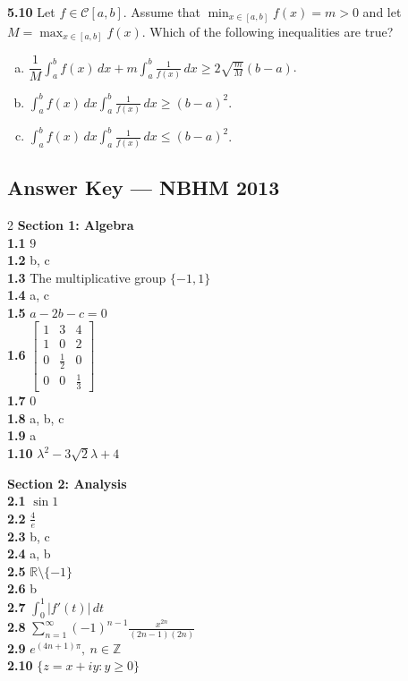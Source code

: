 \documentclass[11pt,a4paper]{article}
\newcommand{\Z}{\mathbb{Z}}
\newcommand{\R}{\mathbb{R}}
\newcommand{\examsec}[1]{%
  \subsection*{#1}
  \vspace{-2pt}
}
\newcommand{\qitem}[1]{\par\medskip\noindent\textbf{#1}\hspace{0.5em}}
\begin{document}
\qitem{5.10} Let $f \in \mathcal{C}[a, b]$. Assume that $\min_{x \in [a, b]} f(x) = m > 0$ and let $M = \max_{x \in [a, b]} f(x)$. Which of the following inequalities are true?
\begin{enumerate}[a.]
  \item $\dfrac{1}{M}\displaystyle\int_a^b f(x)\,dx + m\int_a^b \frac{1}{f(x)}\,dx \ge 2\sqrt{\frac{m}{M}}(b - a)$.
  \item $\displaystyle\int_a^b f(x)\,dx \int_a^b \frac{1}{f(x)}\,dx \ge (b - a)^2$.
  \item $\displaystyle\int_a^b f(x)\,dx \int_a^b \frac{1}{f(x)}\,dx \le (b - a)^2$.
\end{enumerate}

\examsec{Answer Key --- NBHM 2013}
\begin{multicols}{2}
\textbf{Section 1: Algebra}\\
\textbf{1.1} $9$\\
\textbf{1.2} b, c\\
\textbf{1.3} The multiplicative group $\{-1, 1\}$\\
\textbf{1.4} a, c\\
\textbf{1.5} $a - 2b - c = 0$\\
\textbf{1.6} $\begin{bmatrix} 1 & 3 & 4 \\ 1 & 0 & 2 \\ 0 & \frac{1}{2} & 0 \\ 0 & 0 & \frac{1}{3} \end{bmatrix}$\\
\textbf{1.7} $0$\\
\textbf{1.8} a, b, c\\
\textbf{1.9} a\\
\textbf{1.10} $\lambda^2 - 3\sqrt{2}\lambda + 4$

\medskip
\textbf{Section 2: Analysis}\\
\textbf{2.1} $\sin 1$\\
\textbf{2.2} $\frac{4}{e}$\\
\textbf{2.3} b, c\\
\textbf{2.4} a, b\\
\textbf{2.5} $\R \setminus \{-1\}$\\
\textbf{2.6} b\\
\textbf{2.7} $\int_0^1 |f'(t)|\,dt$\\
\textbf{2.8} $\sum_{n=1}^{\infty} (-1)^{n-1}\frac{x^{2n}}{(2n-1)(2n)}$\\
\textbf{2.9} $e^{(4n+1)\pi},\ n \in \Z$\\
\textbf{2.10} $\{z = x + iy : y \ge 0\}$


\end{multicols}
\end{document}
